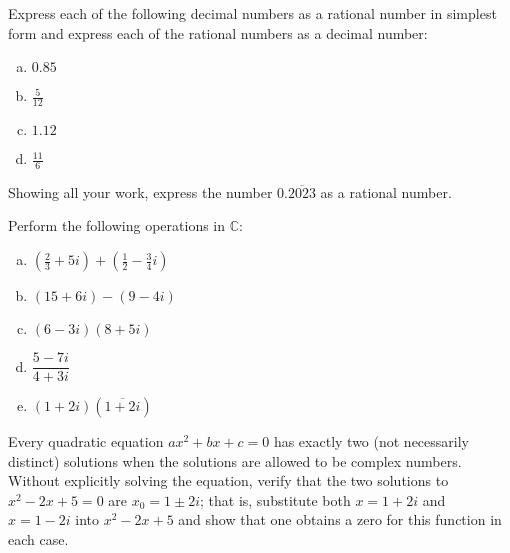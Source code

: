\documentclass[11pt,letterpaper]{article}
\begin{document}

 Express each of the following decimal numbers as a rational number in simplest form and express each of the rational numbers as a decimal number:
	\begin{enumerate}[(a)]
	\item $0.85$
	\item $\frac{5}{12}$
	\item $1.12$
	\item $\frac{11}{6}$
	\end{enumerate}



\newpage



 Showing all your work, express the number $0.\overline{2023}$ as a rational number. 



\newpage



 Perform the following operations in $\mathbb{C}$:
	\begin{enumerate}[(a)]
	\item $(\frac{2}{3} + 5i) + (\frac{1}{2} - \frac{3}{4} i)$
	\item $(15 + 6i) - (9 - 4i)$
	\item $(6 - 3i)(8 + 5i)$
	\item $\dfrac{5 - 7i}{4 + 3i}$
	\item $(1 + 2i) (\overline{1 + 2i})$
	\end{enumerate}



\newpage



 Every quadratic equation $ax^2 + bx + c= 0$ has exactly two (not necessarily distinct) solutions when the solutions are allowed to be complex numbers. Without explicitly solving the equation, verify that the two solutions to $x^2 - 2x + 5= 0$ are $x_0= 1 \pm 2i$; that is, substitute both $x= 1 + 2i$ and $x= 1 - 2i$ into $x^2 - 2x + 5$ and show that one obtains a zero for this function in each case. 
\end{document}
